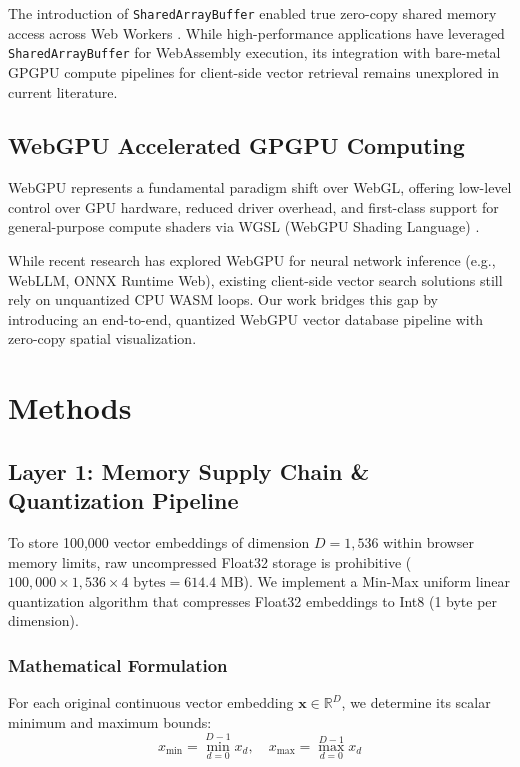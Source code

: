 \documentclass[fleqn,10pt,lineno]{wlpeerj}
\begin{document}
The introduction of \texttt{SharedArrayBuffer} enabled true zero-copy shared memory access across Web Workers \citep{tc39sab}. While high-performance applications have leveraged \texttt{SharedArrayBuffer} for WebAssembly execution, its integration with bare-metal GPGPU compute pipelines for client-side vector retrieval remains unexplored in current literature.

\subsection*{WebGPU Accelerated GPGPU Computing}
WebGPU represents a fundamental paradigm shift over WebGL, offering low-level control over GPU hardware, reduced driver overhead, and first-class support for general-purpose compute shaders via WGSL (WebGPU Shading Language) \citep{w3cwebgpu}. 

While recent research has explored WebGPU for neural network inference (e.g., WebLLM, ONNX Runtime Web), existing client-side vector search solutions still rely on unquantized CPU WASM loops. Our work bridges this gap by introducing an end-to-end, quantized WebGPU vector database pipeline with zero-copy spatial visualization.

\section*{Methods}

\subsection*{Layer 1: Memory Supply Chain \& Quantization Pipeline}

To store 100,000 vector embeddings of dimension $D = 1,536$ within browser memory limits, raw uncompressed Float32 storage is prohibitive ($100,000 \times 1,536 \times 4\text{ bytes} = 614.4\text{ MB}$). We implement a Min-Max uniform linear quantization algorithm that compresses Float32 embeddings to Int8 (1 byte per dimension).

\subsubsection*{Mathematical Formulation}
For each original continuous vector embedding $\mathbf{x} \in \mathbb{R}^D$, we determine its scalar minimum and maximum bounds:
\begin{equation}
x_{\min} = \min_{d=0}^{D-1} x_d, \quad x_{\max} = \max_{d=0}^{D-1} x_d
\label{eq:minmax}
\end{equation}
\end{document}
